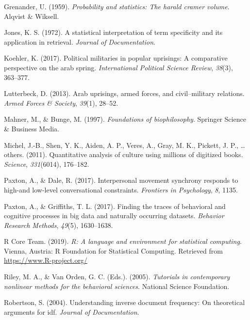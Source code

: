 \documentclass[english,man]{apa6}
\begin{document}
\leavevmode\hypertarget{ref-grenander1959probability}{}%
Grenander, U. (1959). \emph{Probability and statistics: The harald cramer volume}. Alqvist \& Wiksell.

\leavevmode\hypertarget{ref-jones1972statistical}{}%
Jones, K. S. (1972). A statistical interpretation of term specificity and its application in retrieval. \emph{Journal of Documentation}.

\leavevmode\hypertarget{ref-koehler2017political}{}%
Koehler, K. (2017). Political militaries in popular uprisings: A comparative perspective on the arab spring. \emph{International Political Science Review}, \emph{38}(3), 363--377.

\leavevmode\hypertarget{ref-lutterbeck2013arab}{}%
Lutterbeck, D. (2013). Arab uprisings, armed forces, and civil--military relations. \emph{Armed Forces \& Society}, \emph{39}(1), 28--52.

\leavevmode\hypertarget{ref-mahner1997foundations}{}%
Mahner, M., \& Bunge, M. (1997). \emph{Foundations of biophilosophy}. Springer Science \& Business Media.

\leavevmode\hypertarget{ref-michel2011quantitative}{}%
Michel, J.-B., Shen, Y. K., Aiden, A. P., Veres, A., Gray, M. K., Pickett, J. P., \ldots{} others. (2011). Quantitative analysis of culture using millions of digitized books. \emph{Science}, \emph{331}(6014), 176--182.

\leavevmode\hypertarget{ref-paxton2017interpersonal}{}%
Paxton, A., \& Dale, R. (2017). Interpersonal movement synchrony responds to high-and low-level conversational constraints. \emph{Frontiers in Psychology}, \emph{8}, 1135.

\leavevmode\hypertarget{ref-paxton2017finding}{}%
Paxton, A., \& Griffiths, T. L. (2017). Finding the traces of behavioral and cognitive processes in big data and naturally occurring datasets. \emph{Behavior Research Methods}, \emph{49}(5), 1630--1638.

\leavevmode\hypertarget{ref-R-base}{}%
R Core Team. (2019). \emph{R: A language and environment for statistical computing}. Vienna, Austria: R Foundation for Statistical Computing. Retrieved from \url{https://www.R-project.org/}

\leavevmode\hypertarget{ref-riley2005tutorials}{}%
Riley, M. A., \& Van Orden, G. C. (Eds.). (2005). \emph{Tutorials in contemporary nonlinear methods for the behavioral sciences}. National Science Foundation.

\leavevmode\hypertarget{ref-robertson2004understanding}{}%
Robertson, S. (2004). Understanding inverse document frequency: On theoretical arguments for idf. \emph{Journal of Documentation}.
\end{document}
